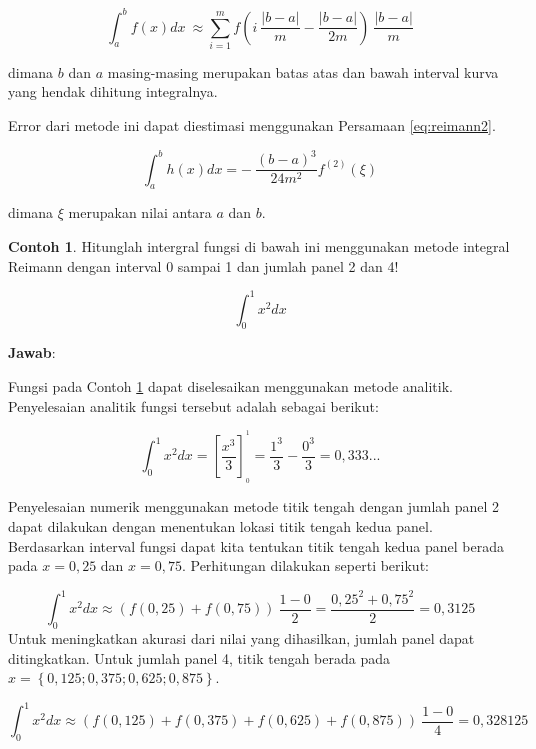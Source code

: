 \documentclass[
]{book}
\theoremstyle{definition}
\theoremstyle{definition}
\newtheorem{example}{Contoh}[chapter]
\theoremstyle{definition}
\theoremstyle{definition}
\theoremstyle{remark}
\begin{document}
\begin{equation}
\int_a^bf\left(x\right)dx\ \approx\sum_{i=1}^mf\left(i\ \frac{\left|b-a\right|}{m}-\frac{\left|b-a\right|}{2m}\right)\ \frac{\left|b-a\right|}{m}
  \label{eq:reimann}
\end{equation}

dimana \(b\) dan \(a\) masing-masing merupakan batas atas dan bawah interval kurva yang hendak dihitung integralnya.

Error dari metode ini dapat diestimasi menggunakan Persamaan \eqref{eq:reimann2}.

\begin{equation}
\int_a^bh\left(x\right)dx=-\ \frac{\left(b-a\right)^3}{24m^2}f^{\left(2\right)}\left(\xi\right)
  \label{eq:reimann2}
\end{equation}

dimana \(\xi\) merupakan nilai antara \(a\) dan \(b\).

\begin{example}
\protect\hypertarget{exm:reimannexm}{}\label{exm:reimannexm}Hitunglah intergral fungsi di bawah ini menggunakan metode integral Reimann dengan interval 0 sampai 1 dan jumlah panel 2 dan 4!
\end{example}

\[
\int_0^1 x^2 dx
\]

\textbf{Jawab}:

Fungsi pada Contoh \ref{exm:reimannexm} dapat diselesaikan menggunakan metode analitik. Penyelesaian analitik fungsi tersebut adalah sebagai berikut:

\[
\int_0^1 x^2 dx = \left[\frac{x^3}{3}\right]_{_0}^{^1}=\frac{1^3}{3}-\frac{0^3}{3}=0,333...
\]

Penyelesaian numerik menggunakan metode titik tengah dengan jumlah panel 2 dapat dilakukan dengan menentukan lokasi titik tengah kedua panel. Berdasarkan interval fungsi dapat kita tentukan titik tengah kedua panel berada pada \(x=0,25\) dan \(x=0,75\). Perhitungan dilakukan seperti berikut:

\[
\int_0^1 x^2 dx \approx \left(f\left(0,25\right)+f\left(0,75\right)\right)\ \frac{1-0}{2}=\frac{0,25^2+0,75^2}{2}=0,3125
\]
Untuk meningkatkan akurasi dari nilai yang dihasilkan, jumlah panel dapat ditingkatkan. Untuk jumlah panel 4, titik tengah berada pada \(x=\left\{0,125;0,375;0,625;0,875\right\}\).

\[
\int_0^1 x^2 dx \approx \left(f\left(0,125\right)+f\left(0,375\right)+f\left(0,625\right)+f\left(0,875\right)\right)\ \frac{1-0}{4}=0,328125
\]
\end{document}
